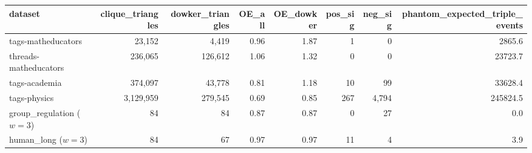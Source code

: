 \begin{tabular}{lrrrrrrr}
\toprule
dataset & clique\_triangles & dowker\_triangles & OE\_all & OE\_dowker & pos\_sig & neg\_sig & phantom\_expected\_triple\_events \\
\midrule
tags-matheducators & 23,152 & 4,419 & 0.96 & 1.87 & 1 & 0 & 2865.6 \\
threads-matheducators & 236,065 & 126,612 & 1.06 & 1.32 & 0 & 0 & 23723.7 \\
tags-academia & 374,097 & 43,778 & 0.81 & 1.18 & 10 & 99 & 33628.4 \\
tags-physics & 3,129,959 & 279,545 & 0.69 & 0.85 & 267 & 4,794 & 245824.5 \\
group\_regulation ($w{=}3$) & 84 & 84 & 0.87 & 0.87 & 0 & 27 & 0.0 \\
human\_long ($w{=}3$) & 84 & 67 & 0.97 & 0.97 & 11 & 4 & 3.9 \\
\bottomrule
\end{tabular}
